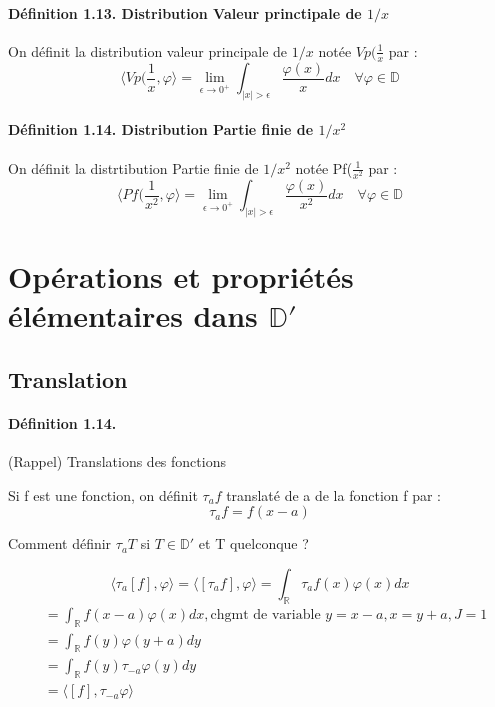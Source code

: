\documentclass[12pt,a4paper]{report}
\newcommand{\ens}[1]{\mathbb{#1}}
\newcommand{\fphi}{\quad \forall \varphi \in \mathbb{D}}
\begin{document}
\paragraph{Définition 1.13. Distribution Valeur princtipale de \(1/x\)}

On définit la distribution valeur principale de \(1/x\) notée \(Vp(\frac{1}{x}\) par :
\[
	\langle Vp(\frac{1}{x}, \varphi \rangle = \lim_{\epsilon \rightarrow 0^+} \int_{\vert x \vert > \epsilon} \dfrac{\varphi(x)}{x}dx \fphi
\]

\paragraph{Définition 1.14. Distribution Partie finie de \(1/x^2\)}

On définit la distrtibution Partie finie de \(1/x^2\) notée Pf(\(\frac{1}{x^2}\) par :
\[
	\langle Pf(\frac{1}{x^2}, \varphi \rangle = \lim_{\epsilon \rightarrow 0^+} \int_{\vert x \vert > \epsilon} \dfrac{\varphi(x)}{x^2}dx \fphi
\]

\section{Opérations et propriétés élémentaires dans \(\ens{D}'\)}

\subsection{Translation}
\paragraph{Définition 1.14.} (Rappel) Translations des fonctions

Si f est une fonction, on définit \(\tau_af\) translaté de a de la fonction f par :
\[
	\tau_af = f(x - a)
\]

Comment définir \(\tau_a T\) si \(T \in \ens{D}'\) et T quelconque ?

\[
	\langle \tau_a [f], \varphi \rangle = \langle [\tau_a f], \varphi \rangle = \int_{\ens{R}} \tau_a f(x) \varphi(x) dx
\]
\begin{align*}
	&= \int_{\ens{R}} f(x-a) \varphi(x) dx, \text{chgmt de variable } y = x - a, x = y + a, J = 1\\
	&= \int_{\ens{R}} f(y) \varphi(y+a) dy\\
	&= \int_{\ens{R}} f(y) \tau_{-a} \varphi(y) dy\\
	&= \langle [f], \tau_{-a}\varphi \rangle
\end{align*}
\end{document}
